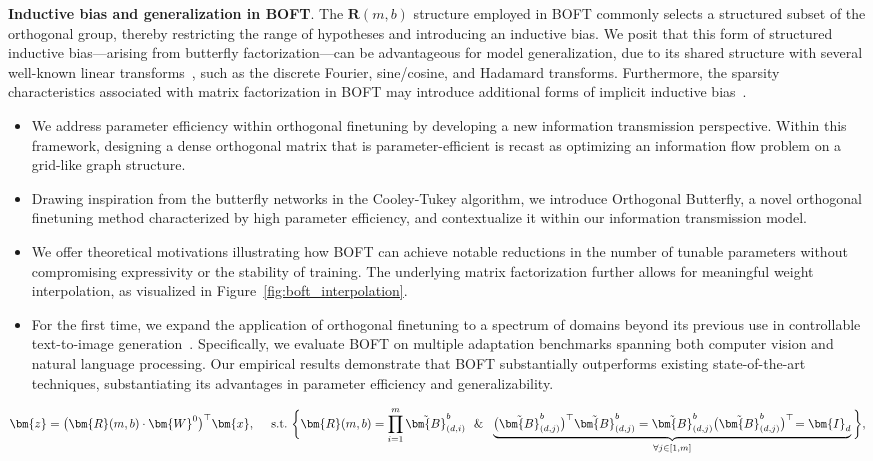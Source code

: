 \textbf{Inductive bias and generalization in BOFT}. The $\bm{R}(m,b)$ structure employed in BOFT commonly selects a structured subset of the orthogonal group, thereby restricting the range of hypotheses and introducing an inductive bias. We posit that this form of structured inductive bias—arising from butterfly factorization—can be advantageous for model generalization, due to its shared structure with several well-known linear transforms~\cite{dao2019kaleidoscope}, such as the discrete Fourier, sine/cosine, and Hadamard transforms. Furthermore, the sparsity characteristics associated with matrix factorization in BOFT may introduce additional forms of implicit inductive bias~\cite{gunasekar2017implicit,li2018algorithmic,liu2019neural}.

\begin{itemize}[leftmargin=*,nosep]
    \item We address parameter efficiency within orthogonal finetuning by developing a new information transmission perspective. Within this framework, designing a dense orthogonal matrix that is parameter-efficient is recast as optimizing an information flow problem on a grid-like graph structure.
    \item Drawing inspiration from the butterfly networks in the Cooley-Tukey algorithm, we introduce Orthogonal Butterfly, a novel orthogonal finetuning method characterized by high parameter efficiency, and contextualize it within our information transmission model.
    \item We offer theoretical motivations illustrating how BOFT can achieve notable reductions in the number of tunable parameters without compromising expressivity or the stability of training. The underlying matrix factorization further allows for meaningful weight interpolation, as visualized in Figure~\ref{fig:boft_interpolation}.
    \item For the first time, we expand the application of orthogonal finetuning to a spectrum of domains beyond its previous use in controllable text-to-image generation~\cite{qiu2023controlling}. Specifically, we evaluate BOFT on multiple adaptation benchmarks spanning both computer vision and natural language processing. Our empirical results demonstrate that BOFT substantially outperforms existing state-of-the-art techniques, substantiating its advantages in parameter efficiency and generalizability.
\end{itemize}

\begin{equation}
    \begin{aligned}\nonumber
    \bm{z}=\big(\bm{R}(m,b)\cdot\bm{W}^0\big)^\top\bm{x},~~~~\text{s.t.}~\bigg{\{}\bm{R}(m,b)=\prod_{i=1}^m \tilde{\bm{B}}^b_{(d,i)}~~\&~~\underbrace{\big(\tilde{\bm{B}}^b_{(d,j)}\big)^\top\tilde{\bm{B}}^b_{(d,j)}=\tilde{\bm{B}}^b_{(d,j)}\big(\tilde{\bm{B}}^b_{(d,j)}\big)^\top\!=\bm{I}_d}_{\forall j\in [1, m]}\bigg{\}},
    \end{aligned}
\end{equation}

